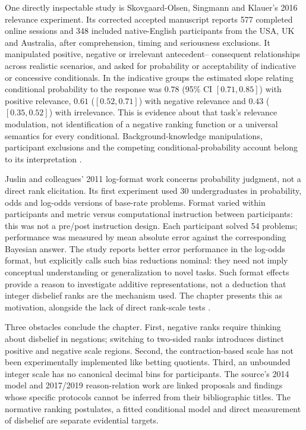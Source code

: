 One directly inspectable study is Skovgaard-Olsen, Singmann and Klauer's
2016 relevance experiment.  Its corrected accepted manuscript reports
577 completed online sessions and 348 included native-English participants
from the USA, UK and Australia, after comprehension, timing and seriousness
exclusions.  It manipulated positive, negative or irrelevant antecedent--
consequent relationships across realistic scenarios, and asked for probability
or acceptability of indicative or concessive conditionals.  In the indicative
groups the estimated slope relating conditional probability to the response
was \(0.78\) (95\% CI \([0.71,0.85]\)) with positive relevance,
\(0.61\) (\([0.52,0.71]\)) with negative relevance and
\(0.43\) (\([0.35,0.52]\)) with irrelevance.  This is evidence about
that task's relevance modulation, not identification of a negative ranking
function or a universal semantics for every conditional.  Background-knowledge
manipulations, participant exclusions and the competing conditional-probability
account belong to its interpretation
\parencite[accepted-manuscript pp.~16--23]{SkovgaardOlsenSingmannKlauer2016Relevance}.

Juslin and colleagues' 2011 log-format work concerns probability judgment,
not a direct rank elicitation.  Its first experiment used 30 undergraduates
in probability, odds and log-odds versions of base-rate problems.  Format
varied within participants and metric versus computational instruction
between participants: this was not a pre/post instruction design.
Each participant solved 54 problems; performance was measured by mean
absolute error against the corresponding Bayesian answer.  The study reports
better error performance in the log-odds format, but explicitly calls such
bias reductions nominal: they need not imply conceptual understanding or
generalization to novel tasks.  Such format effects provide
a reason to investigate additive representations, not a deduction that
integer disbelief ranks are the mechanism used.  The chapter presents this
as motivation, alongside the lack of direct rank-scale tests
\parencite[pp.~253--257]{JuslinEtAl2011Logarithms}.

Three obstacles conclude the chapter.  First, negative ranks require thinking
about disbelief in negations; switching to two-sided ranks introduces distinct
positive and negative scale regions.  Second, the contraction-based scale has
not been experimentally implemented like betting quotients.  Third, an
unbounded integer scale has no canonical decimal bins for participants.
The source's 2014 model and 2017/2019
reason-relation work are linked proposals and findings whose specific
protocols cannot be inferred from their bibliographic titles.  The normative
ranking postulates, a fitted conditional model and direct measurement of
disbelief are separate evidential targets.


